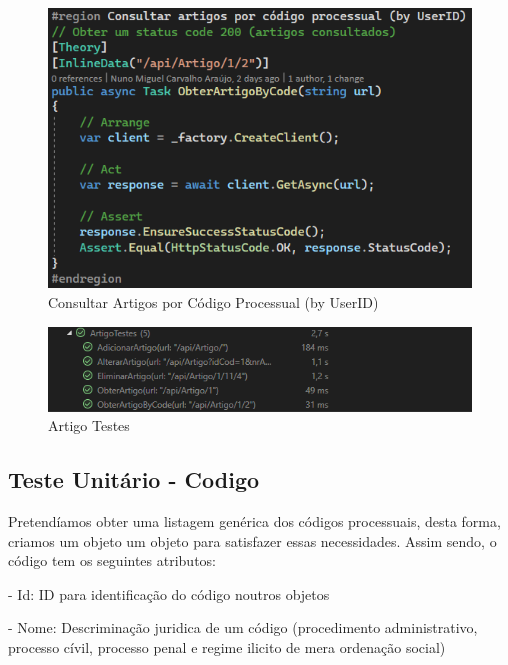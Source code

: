 \begin{figure}[!htbp]
\begin{minipage}[b]{0.4\textwidth}
    \includegraphics[width=\textwidth]{Figuras/TestesUnitarios/Artigo/Consultar artigos por código processual (by UserID).png}
    \caption{Consultar Artigos por Código Processual (by UserID)}
    \label{d.unitario}
  \end{minipage}
\end{figure}

\begin{figure}[!h]
\centering
\includegraphics[width=1\textwidth]{Figuras/Testes/ArtigoTestes.png}
\caption{Artigo Testes}
\label{d.teste}
\end{figure}

\newpage


\subsection{Teste Unitário - Codigo}
\indent \par Pretendíamos obter uma listagem genérica dos códigos processuais, desta forma, criamos um objeto um objeto para satisfazer essas necessidades. Assim sendo, o código tem os seguintes atributos:
\indent \par - Id: ID para identificação do código noutros objetos
\indent \par - Nome: Descriminação juridica de um código (procedimento administrativo, processo cívil, processo penal e regime ilicito de mera ordenação social)

